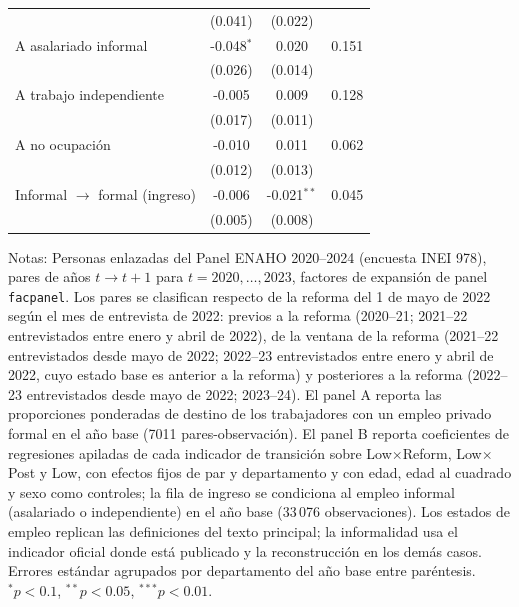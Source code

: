 \begin{table}[!tbp]
\begin{threeparttable}
\begin{tabular}{lccc}
 & (0.041) & (0.022) & \\
A asalariado informal & -0.048$^{*}$ & 0.020 & 0.151 \\
 & (0.026) & (0.014) & \\
A trabajo independiente & -0.005 & 0.009 & 0.128 \\
 & (0.017) & (0.011) & \\
A no ocupación & -0.010 & 0.011 & 0.062 \\
 & (0.012) & (0.013) & \\
Informal $\to$ formal (ingreso) & -0.006 & -0.021$^{**}$ & 0.045 \\
 & (0.005) & (0.008) & \\
\bottomrule
\end{tabular}
\begin{tablenotes}\footnotesize
\item Notas: Personas enlazadas del Panel ENAHO 2020--2024 (encuesta INEI 978), pares de años $t\to t{+}1$ para $t=2020,\dots,2023$, factores de expansión de panel \texttt{facpanel}. Los pares se clasifican respecto de la reforma del 1 de mayo de 2022 según el mes de entrevista de 2022: previos a la reforma (2020--21; 2021--22 entrevistados entre enero y abril de 2022), de la ventana de la reforma (2021--22 entrevistados desde mayo de 2022; 2022--23 entrevistados entre enero y abril de 2022, cuyo estado base es anterior a la reforma) y posteriores a la reforma (2022--23 entrevistados desde mayo de 2022; 2023--24). El panel A reporta las proporciones ponderadas de destino de los trabajadores con un empleo privado formal en el año base (7011 pares-observación). El panel B reporta coeficientes de regresiones apiladas de cada indicador de transición sobre Low$\times$Reform, Low$\times$Post y Low, con efectos fijos de par y departamento y con edad, edad al cuadrado y sexo como controles; la fila de ingreso se condiciona al empleo informal (asalariado o independiente) en el año base (33\,076 observaciones). Los estados de empleo replican las definiciones del texto principal; la informalidad usa el indicador oficial donde está publicado y la reconstrucción en los demás casos. Errores estándar agrupados por departamento del año base entre paréntesis. $^{*}p<0.1$, $^{**}p<0.05$, $^{***}p<0.01$.
\end{tablenotes}
\end{threeparttable}\end{table}
